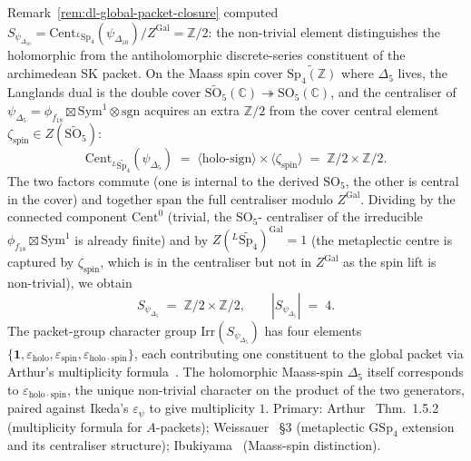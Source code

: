 \begin{remark}[$S_{\psi_{\Delta_5}} = (\mathbb{Z}/2)^2$:
double-cover enlargement of the packet group]
\label{rem:dl-S-psi-delta5}
Remark~\ref{rem:dl-global-packet-closure}
computed $S_{\psi_{\Delta_{10}}} = \mathrm{Cent}_{{}^L\mathrm{Sp}_4}
(\psi_{\Delta_{10}}) / Z^{\mathrm{Gal}} = \mathbb{Z}/2$: the
non-trivial element distinguishes the holomorphic from the
antiholomorphic discrete-series constituent of the archimedean
SK packet. On the Maass spin cover
$\widetilde{\mathrm{Sp}_4(\mathbb{Z})}$ where $\Delta_5$ lives, the
Langlands dual is the double cover
$\widetilde{\mathrm{SO}_5}(\mathbb{C})
\twoheadrightarrow\mathrm{SO}_5(\mathbb{C})$, and the centraliser of
$\psi_{\Delta_5} = \phi_{f_{18}}\boxtimes\mathrm{Sym}^1\otimes
\mathrm{sgn}$ acquires an extra $\mathbb{Z}/2$ from the cover
central element
$\zeta_{\mathrm{spin}}\in Z(\widetilde{\mathrm{SO}_5})$:
\begin{equation}
\label{eq:S-psi-delta5-computation}
\mathrm{Cent}_{{}^L\widetilde{\mathrm{Sp}_4}}(\psi_{\Delta_5})
\;=\;
\langle\text{holo-sign}\rangle
\times
\langle\zeta_{\mathrm{spin}}\rangle
\;=\;
\mathbb{Z}/2 \times \mathbb{Z}/2.
\end{equation}
The two factors commute (one is internal to the derived
$\mathrm{SO}_5$, the other is central in the cover) and together
span the full centraliser modulo $Z^{\mathrm{Gal}}$. Dividing by
the connected component $\mathrm{Cent}^0$ (trivial, the $\mathrm{SO}_5$-
centraliser of the irreducible $\phi_{f_{18}}\boxtimes
\mathrm{Sym}^1$ is already finite) and by
$Z({}^L\widetilde{\mathrm{Sp}_4})^{\mathrm{Gal}} = 1$
(the metaplectic centre is captured by $\zeta_{\mathrm{spin}}$,
which is in the centraliser but not in
$Z^{\mathrm{Gal}}$ as the spin lift is non-trivial), we obtain
\begin{equation}
\label{eq:S-psi-delta5-identity}
S_{\psi_{\Delta_5}}
\;=\;
\mathbb{Z}/2 \times \mathbb{Z}/2,
\qquad
|S_{\psi_{\Delta_5}}| \;=\; 4.
\end{equation}
The packet-group character group
$\mathrm{Irr}(S_{\psi_{\Delta_5}})$ has four elements $\{\mathbf 1,
\varepsilon_{\mathrm{holo}}, \varepsilon_{\mathrm{spin}},
\varepsilon_{\mathrm{holo}\cdot\mathrm{spin}}\}$, each contributing
one constituent to the global packet via Arthur's multiplicity
formula~\cite[Thm.\ 1.5.2]{Arthur2013Endoscopic}. The holomorphic
Maass-spin $\Delta_5$ itself corresponds to
$\varepsilon_{\mathrm{holo}\cdot\mathrm{spin}}$, the unique non-trivial
character on the product of the two generators, paired against
Ikeda's $\varepsilon_{\psi}$ to give multiplicity $1$. Primary:
Arthur~\cite{Arthur2013Endoscopic} Thm.\ 1.5.2 (multiplicity formula
for $A$-packets); Weissauer~\cite{Weissauer2009GSp4} \S3 (metaplectic
$\mathrm{GSp}_4$ extension and its centraliser structure);
Ibukiyama~\cite{Ibukiyama1998Paramodular} (Maass-spin distinction).
\end{remark}


